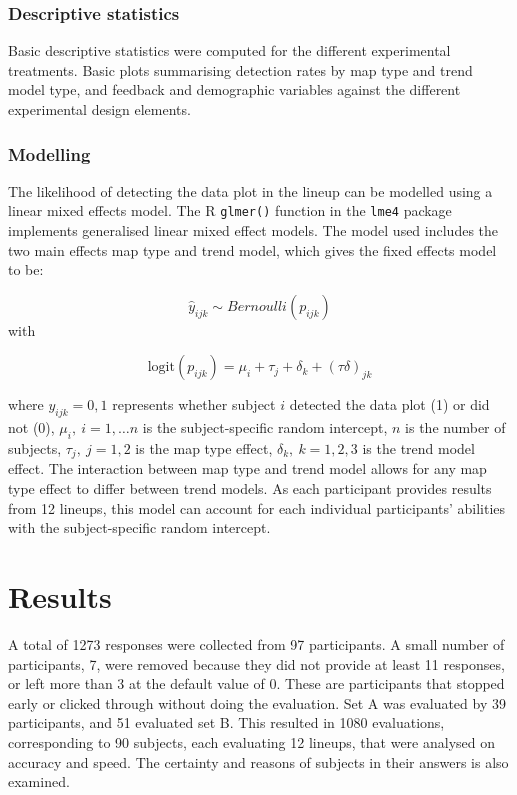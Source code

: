 \documentclass[
doublespace,
  times]{anzsauth}
\begin{document}
\subsubsection{Descriptive statistics}\label{descriptive-statistics}

Basic descriptive statistics were computed for the different
experimental treatments. Basic plots summarising detection rates by map
type and trend model type, and feedback and demographic variables
against the different experimental design elements.

\subsubsection{Modelling}\label{modelling}

The likelihood of detecting the data plot in the lineup can be modelled
using a linear mixed effects model. The R \texttt{glmer()} function in
the \texttt{lme4} \citep{lme4} package implements generalised linear
mixed effect models. The model used includes the two main effects map
type and trend model, which gives the fixed effects model to be:

\[
\hat{y}_{ijk} \sim Bernoulli(p_{ijk})
\] with

\[
\text{logit}(p_{ijk}) = \mu_i + \tau_j + \delta_k + (\tau \delta)_{jk}
\]

where \(y_{ijk} = 0, 1\) represents whether subject \(i\) detected the
data plot (1) or did not (0), \(\mu_i, ~i=1, \dots n\) is the
subject-specific random intercept, \(n\) is the number of subjects,
\(\tau_j, ~j=1,2\) is the map type effect, \(\delta_k, ~k=1,2,3\) is the
trend model effect. The interaction between map type and trend model
allows for any map type effect to differ between trend models. As each
participant provides results from 12 lineups, this model can account for
each individual participants' abilities with the subject-specific random
intercept.

\section{Results}\label{sec-results}

A total of 1273 responses were collected from 97 participants. A small
number of participants, 7, were removed because they did not provide at
least 11 responses, or left more than 3 at the default value of 0. These
are participants that stopped early or clicked through without doing the
evaluation. Set A was evaluated by 39 participants, and 51 evaluated set
B. This resulted in 1080 evaluations, corresponding to 90 subjects, each
evaluating 12 lineups, that were analysed on accuracy and speed. The
certainty and reasons of subjects in their answers is also examined.
\end{document}
